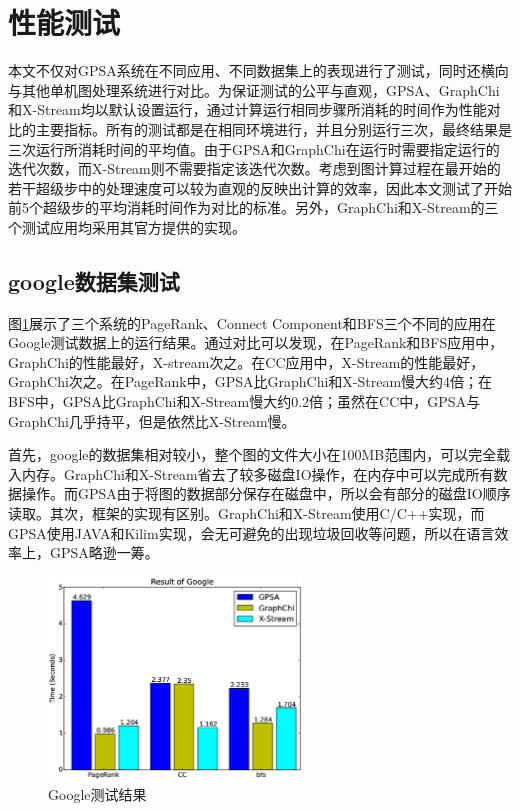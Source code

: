 \section{性能测试}
本文不仅对GPSA系统在不同应用、不同数据集上的表现进行了测试，同时还横向与其他单机图处理系统进行对比。为保证测试的公平与直观，GPSA、GraphChi和X-Stream均以默认设置运行，通过计算运行相同步骤所消耗的时间作为性能对比的主要指标。所有的测试都是在相同环境进行，并且分别运行三次，最终结果是三次运行所消耗时间的平均值。由于GPSA和GraphChi在运行时需要指定运行的迭代次数，而X-Stream则不需要指定该迭代次数。考虑到图计算过程在最开始的若干超级步中的处理速度可以较为直观的反映出计算的效率，因此本文测试了开始前5个超级步的平均消耗时间作为对比的标准。另外，GraphChi和X-Stream的三个测试应用均采用其官方提供的实现。

\subsection{google数据集测试}
图\ref{res:google}展示了三个系统的PageRank、Connect Component和BFS三个不同的应用在Google测试数据上的运行结果。通过对比可以发现，在PageRank和BFS应用中，GraphChi的性能最好，X-stream次之。在CC应用中，X-Stream的性能最好，GraphChi次之。在PageRank中，GPSA比GraphChi和X-Stream慢大约4倍；在BFS中，GPSA比GraphChi和X-Stream慢大约0.2倍；虽然在CC中，GPSA与GraphChi几乎持平，但是依然比X-Stream慢。

首先，google的数据集相对较小，整个图的文件大小在100MB范围内，可以完全载入内存。GraphChi和X-Stream省去了较多磁盘IO操作，在内存中可以完成所有数据操作。而GPSA由于将图的数据部分保存在磁盘中，所以会有部分的磁盘IO顺序读取。其次，框架的实现有区别。GraphChi和X-Stream使用C/C++实现，而GPSA使用JAVA和Kilim实现，会无可避免的出现垃圾回收等问题，所以在语言效率上，GPSA略逊一筹。

\begin{figure}[htbp]
\centering
\includegraphics[width=0.6\textwidth,scale=0.8]{myfigures/googletime2.eps}
\caption{Google测试结果}
\label{res:google}
\end{figure}

